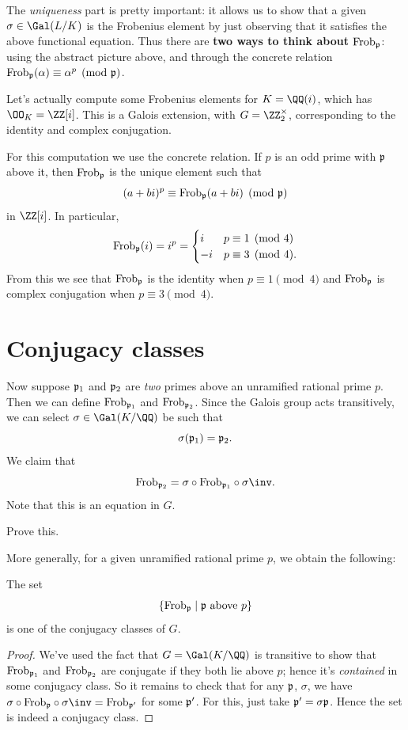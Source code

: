 The \emph{uniqueness} part is pretty important:
it allows us to show that a given $\sigma \in \Gal(L/K)$
is the Frobenius element by just observing that it satisfies
the above functional equation.
Thus there are \textbf{two ways to think about $\mathrm{Frob}_\mathfrak p$}:
using the abstract picture above,
and through the concrete relation $\mathrm{Frob}_\mathfrak p(\alpha) \equiv \alpha^p \pmod{\mathfrak p}$.


\begin{example}
	Let's actually compute some Frobenius elements for $K = \QQ(i)$,
	which has $\OO_K = \ZZ[i]$.
	This is a Galois extension, with $G = \Zm2$,
	corresponding to the identity and complex conjugation.

	For this computation we use the concrete relation.
	If $p$ is an odd prime with $\mathfrak p$ above it,
	then $\mathrm{Frob}_\mathfrak p$ is the unique element such that
	\[ (a+bi)^p \equiv \mathrm{Frob}_\mathfrak p(a+bi) \pmod{\mathfrak p} \]
	in $\ZZ[i]$. In particular,
	\[ \mathrm{Frob}_\mathfrak p(i) = i^p = 
		\begin{cases}
			i & p \equiv 1 \pmod 4 \\
			-i & p \equiv 3 \pmod 4.
		\end{cases}
	\]
	From this we see that $\mathrm{Frob}_\mathfrak p$ is the identity when $p \equiv 1 \pmod 4$
	and $\mathrm{Frob}_\mathfrak p$ is complex conjugation when $p \equiv 3 \pmod 4$.
\end{example}

\section{Conjugacy classes}
Now suppose $\mathfrak p_1$ and $\mathfrak p_2$ are \emph{two} primes above an unramified rational prime $p$.
Then we can define $\mathrm{Frob}_{\mathfrak p_1}$ and $\mathrm{Frob}_{\mathfrak p_2}$.
Since the Galois group acts transitively,
we can select $\sigma \in \Gal(K/\QQ)$ be such that
\[ \sigma(\mathfrak p_1) = \mathfrak p_2. \]
We claim that
\[
	\Frob_{\pp_2} = \sigma \circ \Frob_{\pp_1} \circ \sigma\inv.
\]
Note that this is an equation in $G$.
\begin{ques}
	Prove this.
\end{ques}

More generally, for a given unramified rational prime $p$, we obtain the following:
\begin{theorem}
	The set
	\[ \left\{ \mathrm{Frob}_\mathfrak p \mid \mathfrak p \text{ above } p \right\} \]
	is one of the conjugacy classes of $G$.
\end{theorem}
\begin{proof}
	We've used the fact that $G = \Gal(K/\QQ)$ is transitive
	to show that $\mathrm{Frob}_{\mathfrak p_1}$ and $\mathrm{Frob}_{\mathfrak p_2}$ are conjugate
	if they both lie above $p$; hence it's \emph{contained} in some
	conjugacy class.
	So it remains to check that for any $\mathfrak p$, $\sigma$,
	we have $\sigma \circ \Frob_\pp \circ \sigma\inv = \Frob_{\pp'}$
	for some $\mathfrak p'$. For this, just take $\mathfrak p' = \sigma\mathfrak p$.
	Hence the set is indeed a conjugacy class.
\end{proof}

